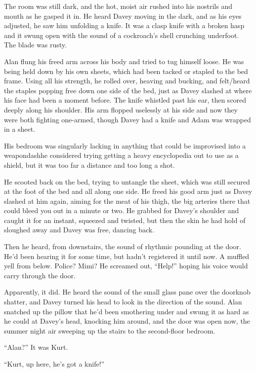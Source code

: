 The room was still dark, and the hot, moist air rushed into his
nostrils and mouth as he gasped it in.  He heard Davey moving in the
dark, and as his eyes adjusted, he saw him unfolding a knife.  It was
a clasp knife with a broken hasp and it swung open with the sound of a
cockroach's shell crunching underfoot.  The blade was rusty.

Alan flung his freed arm across his body and tried to tug himself
loose.  He was being held down by his own sheets, which had been
tacked or stapled to the bed frame.  Using all his strength, he rolled
over, heaving and bucking, and felt/heard the staples popping free
down one side of the bed, just as Davey slashed at where his face had
been a moment before.  The knife whistled past his ear, then scored
deeply along his shoulder.  His arm flopped uselessly at his side and
now they were both fighting one-armed, though Davey had a knife and
Adam was wrapped in a sheet.

His bedroom was singularly lacking in anything that could be
improvised into a weapondash{}he considered trying getting a heavy
encyclopedia out to use as a shield, but it was too far a distance and
too long a shot.

He scooted back on the bed, trying to untangle the sheet, which was
still secured at the foot of the bed and all along one side.  He freed
his good arm just as Davey slashed at him again, aiming for the meat
of his thigh, the big arteries there that could bleed you out in a
minute or two.  He grabbed for Davey's shoulder and caught it for an
instant, squeezed and twisted, but then the skin he had hold of
sloughed away and Davey was free, dancing back.

Then he heard, from downstairs, the sound of rhythmic pounding at the
door.  He'd been hearing it for some time, but hadn't registered it
until now.  A muffled yell from below.  Police?  Mimi?  He screamed
out, ``Help!'' hoping his voice would carry through the door.

Apparently, it did.  He heard the sound of the small glass pane over
the doorknob shatter, and Davey turned his head to look in the
direction of the sound.  Alan snatched up the pillow that he'd been
smothering under and swung it as hard as he could at Davey's head,
knocking him around, and the door was open now, the summer night air
sweeping up the stairs to the second-floor bedroom.

``Alan?'' It was Kurt.

``Kurt, up here, he's got a knife!''


